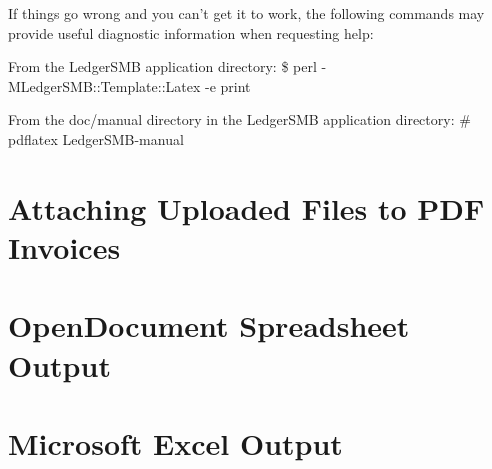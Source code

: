 If things go wrong and you can't get it to work, the following
commands may provide useful diagnostic information when requesting
help:

From the LedgerSMB application directory:
\$ perl -MLedgerSMB::Template::Latex -e print

From the doc/manual directory in the LedgerSMB application directory:
\# pdflatex LedgerSMB-manual

\section{Attaching Uploaded Files to PDF Invoices}
\label{sec-options-uploaded-files-invoices}

\section{OpenDocument Spreadsheet Output}
\label{sec-options-ODS-spreadsheet-output}


\section{Microsoft Excel Output}
\label{sec-options-XLS-spreadsheet-output}

